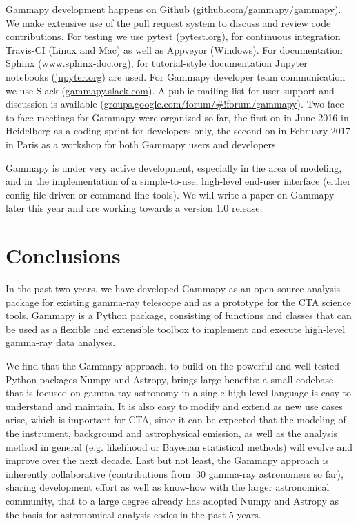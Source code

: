 \documentclass{PoS}
\newcommand{\urlGammapySlack}{\href{https://gammapy.slack.com}{gammapy.slack.com}}
\newcommand{\urlGammapyGithub}{\href{https://github.com/gammapy/gammapy}{github.com/gammapy/gammapy}}
\newcommand{\urlPytest}{\href{https://pytest.org}{pytest.org}}
\newcommand{\urlSphinx}{\href{http://www.sphinx-doc.org}{www.sphinx-doc.org}}
\newcommand{\urlJupyter}{\href{https://jupyter.org}{jupyter.org}}
\newcommand{\urlGammapyForum}{\href{https://groups.google.com/forum/\#!forum/gammapy}{groups.google.com/forum/\#!forum/gammapy}}
\begin{document}
Gammapy development happens on Github (\urlGammapyGithub). We make extensive use
of the pull request system to discuss and review code contributions. For testing
we use pytest (\urlPytest), for continuous integration Travis-CI (Linux and Mac)
as well as Appveyor (Windows). For documentation Sphinx (\urlSphinx), for
tutorial-style documentation Jupyter notebooks (\urlJupyter) are used. For
Gammapy developer team communication we use Slack (\urlGammapySlack). A public
mailing list for user support and discussion is available (\urlGammapyForum).
Two face-to-face meetings for Gammapy were organized so far, the first on in
June 2016 in Heidelberg as a coding sprint for developers only, the second on in
February 2017 in Paris as a workshop for both Gammapy users and developers.


Gammapy is under very active development, especially in the area of modeling,
and in the implementation of a simple-to-use, high-level end-user interface
(either config file driven or command line tools). We will write a paper on
Gammapy later this year and are working towards a version 1.0 release.

\section{Conclusions}
\label{sec:conclusions}

In the past two years, we have developed Gammapy as an open-source analysis
package for existing gamma-ray telescope and as a prototype for the CTA science
tools. Gammapy is a Python package, consisting of functions and classes that can
be used as a flexible and extensible toolbox to implement and execute high-level
gamma-ray data analyses.

We find that the Gammapy approach, to build on the powerful and well-tested
Python packages Numpy and Astropy, brings large benefits: a small codebase that
is focused on gamma-ray astronomy in a single high-level language is easy to
understand and maintain. It is also easy to modify and extend as new use cases
arise, which is important for CTA, since it can be expected that the modeling of
the instrument, background and astrophysical emission, as well as the analysis
method in general (e.g. likelihood or Bayesian statistical methods) will evolve
and improve over the next decade. Last but not least, the Gammapy approach is
inherently collaborative (contributions from $~$30 gamma-ray astronomers so
far),  sharing development effort as well as know-how with the larger
astronomical community,  that to a large degree already has adopted Numpy and
Astropy as the basis for astronomical analysis codes in the past 5 years.
\end{document}
